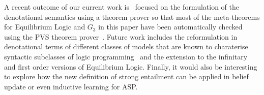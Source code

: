 \documentclass{tlp}
\begin{document}
A recent outcome of our current work is~\cite{CMMSE15} focused on the formulation of the denotational semantics using a theorem prover so that most of the meta-theorems for Equilibrium Logic and $G_3$ in this paper have been automatically checked using the PVS theorem prover~\cite{PVS92}. Future work includes the reformulation in denotational terms of different classes of models that are known to charaterise syntactic subclasses of logic programming~\cite{FINK11,FINK13} and the extension to the infinitary and first order versions of Equilibrium Logic. Finally, it would also be interesting to explore how the new definition of strong entailment can be applied in belief update or even inductive learning for ASP.

\newpage


\end{document}
